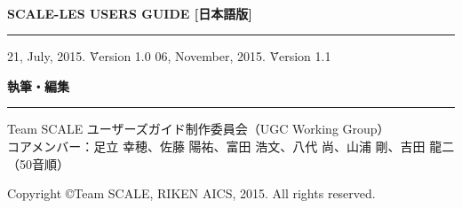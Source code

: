 \newpage
\thispagestyle{empty}

　\\

\vspace{10mm}
{\large{\bf SCALE-LES USERS GUIDE [日本語版]}}\\
\hrule width 90mm
\begin{tabbing} 
21, July, 2015.  \= \=  Version 1.0
06, November, 2015.  \= \=  Version 1.1
\end{tabbing} 


\vspace{10mm}
{\large{\bf 執筆・編集}}\\
\hrule width 90mm
\begin{tabbing} 
Team SCALE ユーザーズガイド制作委員会（UGC Working Group）\\
コアメンバー：足立 幸穂、佐藤 陽祐、富田 浩文、八代 尚、山浦 剛、吉田 龍二（50音順）\\
\end{tabbing} 


\vspace{110mm}
\begin{flushright}

\vspace{10mm}
Copyright \copyright Team SCALE, RIKEN AICS, 2015. All rights reserved.
\end{flushright}

